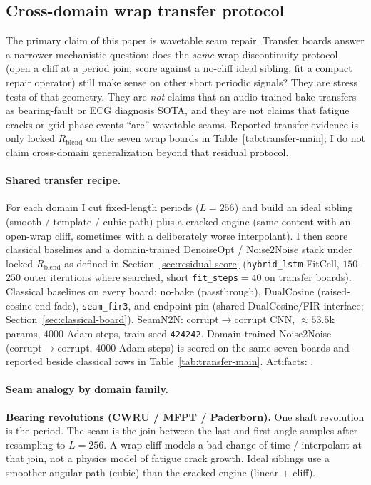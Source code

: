 
\subsection{Cross-domain wrap transfer protocol}
\label{sec:transfer-protocol}

The primary claim of this paper is wavetable seam repair.
Transfer boards answer a narrower mechanistic question:
does the \emph{same} wrap-discontinuity protocol (open a cliff at a period join, score against a no-cliff ideal sibling, fit a compact repair operator) still make sense on other short periodic signals?
They are stress tests of that geometry.
They are \emph{not} claims that an audio-trained bake transfers as bearing-fault or ECG diagnosis SOTA,
and they are not claims that fatigue cracks or grid phase events ``are'' wavetable seams.
Reported transfer evidence is only locked $R_{\mathrm{blend}}$ on the seven wrap boards in Table~\ref{tab:transfer-main}; I do not claim cross-domain generalization beyond that residual protocol.

\paragraph{Shared transfer recipe.}
For each domain I cut fixed-length periods ($L{=}256$) and build an ideal sibling (smooth / template / cubic path) plus a cracked engine (same content with an open-wrap cliff, sometimes with a deliberately worse interpolant).
I then score classical baselines and a domain-trained DenoiseOpt / Noise2Noise stack under locked $R_{\mathrm{blend}}$ as defined in Section~\ref{sec:residual-score}
(\texttt{hybrid\_lstm} FitCell, $150$--$250$ outer iterations where searched, short \texttt{fit\_steps}${}={}40$ on transfer boards).
Classical baselines on every board: no-bake (passthrough), DualCosine (raised-cosine end fade), \texttt{seam\_fir3}, and endpoint-pin (shared DualCosine/FIR interface; Section~\ref{sec:classical-board}).
SeamN2N: corrupt$\to$corrupt CNN, ${\approx}53.5$k params, $4000$ Adam steps, train seed \texttt{424242}.
Domain-trained Noise2Noise (corrupt$\to$corrupt, $4000$ Adam steps) is scored on the same seven boards and reported beside classical rows in Table~\ref{tab:transfer-main}.
Artifacts:
.

\paragraph{Seam analogy by domain family.}
\textbf{Bearing revolutions (CWRU / MFPT / Paderborn).}
One shaft revolution is the period.
The seam is the join between the last and first angle samples after resampling to $L{=}256$.
A wrap cliff models a bad change-of-time / interpolant at that join, not a physics model of fatigue crack growth.
Ideal siblings use a smoother angular path (cubic) than the cracked engine (linear + cliff).

